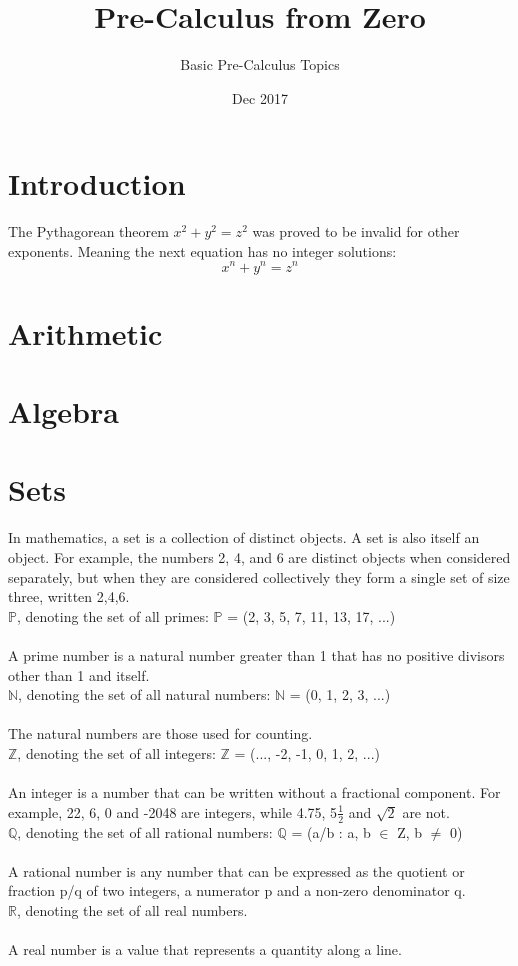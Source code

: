 \documentclass[12pt, letterpaper]{article}
\title{Pre-Calculus from Zero}
\author{Basic Pre-Calculus Topics}
\date{Dec 2017}
\begin{document}
\maketitle
\section{Introduction}
The Pythagorean theorem $x^2 + y^2 = z^2$ was proved to be invalid for other 
exponents. Meaning the next equation has no integer solutions:
$$x^n+ y^n = z^n$$
\section{Arithmetic}
\section{Algebra}
\section{Sets}
In mathematics, a set is a collection of distinct objects. A set is also itself
an object. For example, the numbers 2, 4, and 6 are distinct objects when 
considered separately, but when they are considered collectively they form a 
single set of size three, written {2,4,6}.
\\
$\mathbb{P}$, denoting the set of all primes:
$\mathbb{P}$ = (2, 3, 5, 7, 11, 13, 17, ...)
\\\\
A prime number is a natural number greater than 1 that has no positive
divisors other than 1 and itself.
\\
$\mathbb{N}$, denoting the set of all natural numbers:
$\mathbb{N}$ = (0, 1, 2, 3, ...)
\\\\
The natural numbers are those used for counting.
\\
$\mathbb{Z}$, denoting the set of all integers: 
$\mathbb{Z}$ = (..., -2, -1, 0, 1, 2, ...)
\\\\
An integer is a number that can be written without a fractional component.
For example, 22, 6, 0 and -2048 are integers,
while 4.75, 5$\frac{1}{2}$ and $\sqrt{2}$ are not.
\\
$\mathbb{Q}$, denoting the set of all rational numbers:
$\mathbb{Q}$ = (a/b : a, b $\in$ Z, b $\neq$ 0)
\\\\
A rational number is any number that can be expressed as the quotient or
fraction p/q of two integers, a numerator p and a non-zero denominator q.
\\
$\mathbb{R}$, denoting the set of all real numbers.
\\\\
A real number is a value that represents a quantity along a line.
\\
\end{document}
